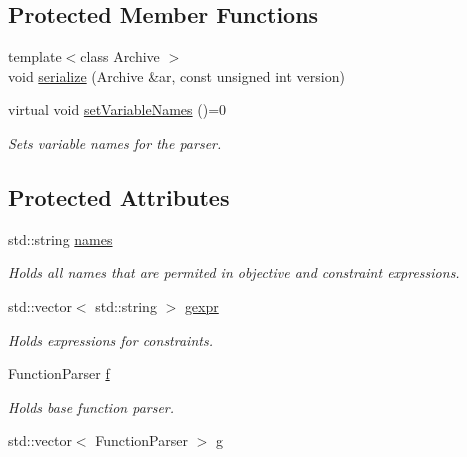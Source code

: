 \subsection*{Protected Member Functions}
\begin{DoxyCompactItemize}
\item 
{\footnotesize template$<$class Archive $>$ }\\void \hyperlink{class_go_s_u_m_1_1_c_constraints_af98bbd20b50e8db2b88630d865fbf10f}{serialize} (Archive \&ar, const unsigned int version)
\item 
virtual void \hyperlink{class_go_s_u_m_1_1_c_constraints_a68a322c212879db65e3ebc1c1f201432}{set\-Variable\-Names} ()=0
\begin{DoxyCompactList}\small\item\em Sets variable names for the parser. \end{DoxyCompactList}\end{DoxyCompactItemize}
\subsection*{Protected Attributes}
\begin{DoxyCompactItemize}
\item 
std\-::string \hyperlink{class_go_s_u_m_1_1_c_constraints_a94ad221dd1376199a48858e01fc6e19e}{names}
\begin{DoxyCompactList}\small\item\em Holds all names that are permited in objective and constraint expressions. \end{DoxyCompactList}\item 
std\-::vector$<$ std\-::string $>$ \hyperlink{class_go_s_u_m_1_1_c_constraints_a9a560b064cc42cd4c9447d3891cf2f65}{gexpr}
\begin{DoxyCompactList}\small\item\em Holds expressions for constraints. \end{DoxyCompactList}\item 
Function\-Parser \hyperlink{class_go_s_u_m_1_1_c_constraints_a9205ec417c8870e9f4b5001db082d782}{f}
\begin{DoxyCompactList}\small\item\em Holds base function parser. \end{DoxyCompactList}\item 
std\-::vector$<$ Function\-Parser $>$ \hyperlink{class_go_s_u_m_1_1_c_constraints_ac862006b869d239f27b466a6e0cfabb2}{g}
\end{DoxyCompactItemize}
